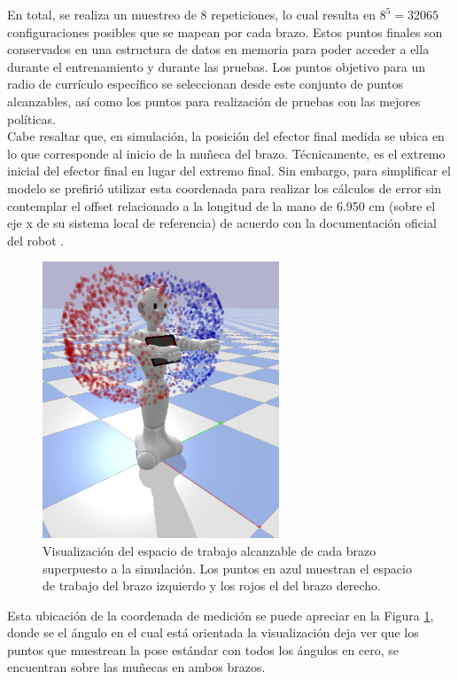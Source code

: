En total, se realiza un muestreo de 8 repeticiones, lo cual resulta en $8^5 = 32065$ configuraciones posibles que se mapean por cada brazo. Estos puntos finales son conservados en una estructura de datos en memoria para poder acceder a ella durante el entrenamiento y durante las pruebas. Los puntos objetivo para un radio de currículo específico se seleccionan desde este conjunto de puntos alcanzables, así como los puntos para realización de pruebas con las mejores políticas.\\

Cabe resaltar que, en simulación, la posición del efector final medida se ubica en lo que corresponde al inicio de la muñeca del brazo. Técnicamente, es el extremo inicial del efector final en lugar del extremo final. Sin embargo, para simplificar el modelo se prefirió utilizar esta coordenada para realizar los cálculos de error sin contemplar el offset relacionado a la longitud de la mano de 6.950 cm (sobre el eje x de su sistema local de referencia) de acuerdo con la documentación oficial del robot \parencite{softbank2023pepper}. \\

\begin{figure}[h!]
	\centering
	\includegraphics[width=200pt]{images/metodologia/workspace}
	\caption{Visualización del espacio de trabajo alcanzable de cada brazo superpuesto a la simulación. Los puntos en azul muestran el espacio de trabajo del brazo izquierdo y los rojos el del brazo derecho.}
	\label{fig:workspace}
\end{figure}

Esta ubicación de la coordenada de medición se puede apreciar en la Figura \ref{fig:workspace}, donde se el ángulo en el cual está orientada la visualización deja ver que los puntos que muestrean la pose estándar con todos los ángulos en cero, se encuentran sobre las muñecas en ambos brazos.


